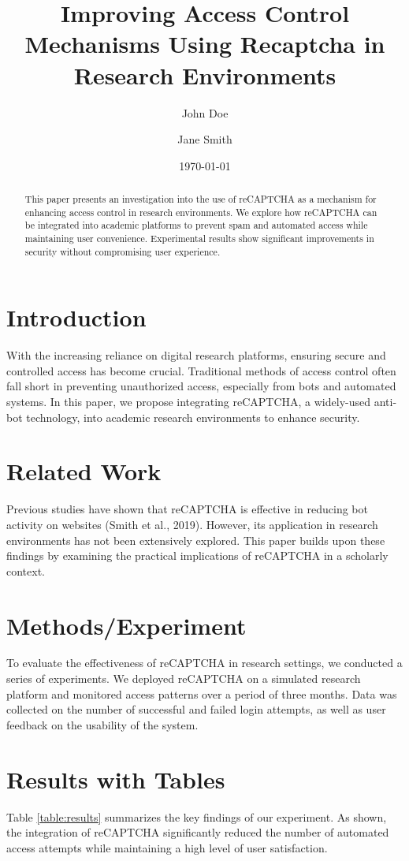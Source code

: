 \documentclass{article}
\title{Improving Access Control Mechanisms Using Recaptcha in Research Environments}
\author{John Doe \and Jane Smith}
\date{\today}
\begin{document}
\maketitle

\begin{abstract}
This paper presents an investigation into the use of reCAPTCHA as a mechanism for enhancing access control in research environments. We explore how reCAPTCHA can be integrated into academic platforms to prevent spam and automated access while maintaining user convenience. Experimental results show significant improvements in security without compromising user experience.
\end{abstract}

\section{Introduction}
With the increasing reliance on digital research platforms, ensuring secure and controlled access has become crucial. Traditional methods of access control often fall short in preventing unauthorized access, especially from bots and automated systems. In this paper, we propose integrating reCAPTCHA, a widely-used anti-bot technology, into academic research environments to enhance security.

\section{Related Work}
Previous studies have shown that reCAPTCHA is effective in reducing bot activity on websites (Smith et al., 2019). However, its application in research environments has not been extensively explored. This paper builds upon these findings by examining the practical implications of reCAPTCHA in a scholarly context.

\section{Methods/Experiment}
To evaluate the effectiveness of reCAPTCHA in research settings, we conducted a series of experiments. We deployed reCAPTCHA on a simulated research platform and monitored access patterns over a period of three months. Data was collected on the number of successful and failed login attempts, as well as user feedback on the usability of the system.

\section{Results with Tables}
Table \ref{table:results} summarizes the key findings of our experiment. As shown, the integration of reCAPTCHA significantly reduced the number of automated access attempts while maintaining a high level of user satisfaction.
\end{document}

